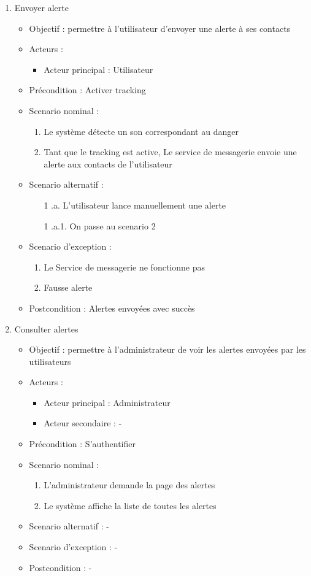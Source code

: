 \begin{enumerate}[label=\alph*.]
	\item Envoyer alerte
	\begin{itemize}
		\item Objectif : permettre à l’utilisateur d’envoyer une alerte à ses contacts
		\item Acteurs :
		\begin{itemize}
			\item Acteur principal : Utilisateur
		\end{itemize}
		\item Précondition : Activer tracking
		\item Scenario nominal :
		\begin{enumerate}[label=\arabic*.]
			\item Le système détecte un son correspondant au danger
			\item Tant que le tracking est active, Le service de messagerie envoie une alerte aux contacts de l’utilisateur
		\end{enumerate}
		\item Scenario alternatif :
		\begin{enumerate}[label=\arabic*.]
			\item[1] .a. L'utilisateur lance manuellement une alerte
			\item[1] .a.1. On passe au scenario 2
		\end{enumerate}
		\item Scenario d’exception : 
		\begin{enumerate}[label=\arabic*.]
			\item Le Service de messagerie ne fonctionne pas
			\item Fausse alerte
		\end{enumerate}
		\item Postcondition : Alertes envoyées avec succès
	\end{itemize}
	
	\item Consulter alertes
	\begin{itemize}
		\item Objectif : permettre à l’administrateur de voir les alertes envoyées par les utilisateurs
		\item Acteurs :
		\begin{itemize}
			\item Acteur principal : Administrateur
			\item Acteur secondaire : -
		\end{itemize}
		\item Précondition : S’authentifier
		\item Scenario nominal :
		\begin{enumerate}[label=\arabic*.]
			\item L’administrateur demande la page des alertes
			\item Le système affiche la liste de toutes les alertes
		\end{enumerate}
		\item Scenario alternatif : -
		\item Scenario d’exception : -
		\item Postcondition : -
	\end{itemize}
		

\end{enumerate}
